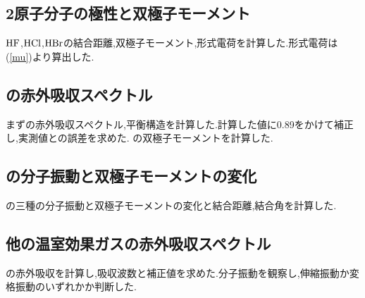 \documentclass[a4j,10pt,dvipdfmx]{jarticle}
\begin{document}
  \subsection{2原子分子の極性と双極子モーメント}
  $\ce{HF}$,$\ce{HCl}$,$\ce{HBr}$の結合距離,双極子モーメント,形式電荷を計算した.形式電荷は(\ref{mu})より算出した.
  \subsection{の赤外吸収スペクトル}
  まずの赤外吸収スペクトル,平衡構造を計算した.計算した値に0.89をかけて補正し,実測値との誤差を求めた.
  の双極子モーメントを計算した.
  \subsection{の分子振動と双極子モーメントの変化}
  の三種の分子振動と双極子モーメントの変化と結合距離,結合角\angle{}を計算した.
  \subsection{他の温室効果ガスの赤外吸収スペクトル}
  の赤外吸収を計算し,吸収波数と補正値を求めた.分子振動を観察し,伸縮振動か変格振動のいずれかか判断した.
\end{document}
